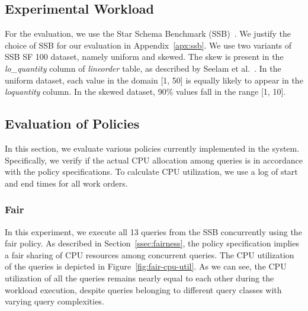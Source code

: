 
\subsection{Experimental Workload}\label{ssec:workload}
For the evaluation, we use the Star Schema Benchmark (SSB)~\cite{ssb}. 
We justify the choice of SSB for our evaluation in Appendix~\ref{apx:ssb}.
We use two variants of SSB SF 100 dataset, namely uniform and skewed. 
The skew is present in the \textit{lo\_quantity} column of \textit{lineorder} table, as described by Seelam et al.~\cite{DBLP:conf/wosp/2013}.
In the uniform dataset, each value in the domain [1, 50] is equally likely to appear in the \textit{lo\textunderscore quantity} column.
In the skewed dataset, 90\% values fall in the range [1, 10]. 

\subsection{Evaluation of Policies}\label{ssec:policy-eval}
In this section, we evaluate various policies currently implemented in the system.
Specifically, we verify if the actual CPU allocation among queries is in accordance with the policy specifications.
To calculate CPU utilization, we use a log of start and end times for all work orders. %

\subsubsection{Fair}
In this experiment, we execute all 13 queries from the SSB concurrently using the fair policy. 
As described in Section~\ref{ssec:fairness}, the policy specification implies a fair sharing of CPU resources among concurrent queries.
The CPU utilization of the queries is depicted in Figure~\ref{fig:fair-cpu-util}.
As we can see, the CPU utilization of all the queries remains nearly equal to each other during the workload execution, despite queries belonging to different query classes with varying query complexities.


